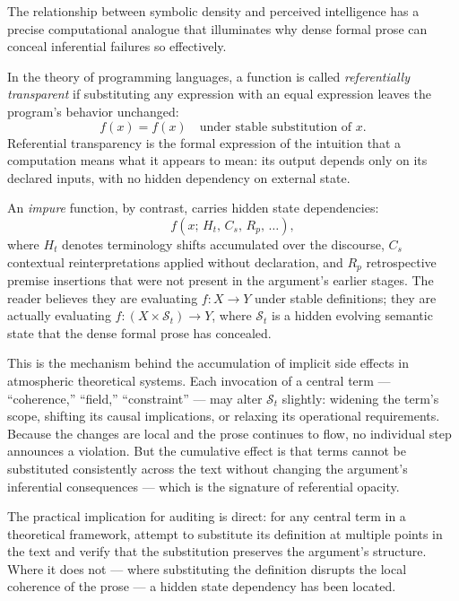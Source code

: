 \documentclass[12pt, openright, twoside]{book}
\begin{document}
\begin{technicalnote}[title={Technical Note: Semantic Referential Transparency}]

The relationship between symbolic density and perceived intelligence has a precise
computational analogue that illuminates why dense formal prose can conceal inferential
failures so effectively.

In the theory of programming languages, a function is called \emph{referentially
transparent} if substituting any expression with an equal expression leaves the
program's behavior unchanged:
\[
f(x) = f(x) \quad \text{under stable substitution of } x.
\]
Referential transparency is the formal expression of the intuition that a computation
means what it appears to mean: its output depends only on its declared inputs, with
no hidden dependency on external state.

An \emph{impure} function, by contrast, carries hidden state dependencies:
\[
f(x;\, H_t,\, C_s,\, R_p,\, \ldots),
\]
where $H_t$ denotes terminology shifts accumulated over the discourse, $C_s$
contextual reinterpretations applied without declaration, and $R_p$ retrospective
premise insertions that were not present in the argument's earlier stages. The reader
believes they are evaluating $f : X \to Y$ under stable definitions; they are
actually evaluating $f : (X \times \mathcal{S}_t) \to Y$, where $\mathcal{S}_t$ is
a hidden evolving semantic state that the dense formal prose has concealed.

This is the mechanism behind the accumulation of implicit side effects in atmospheric
theoretical systems. Each invocation of a central term --- ``coherence,'' ``field,''
``constraint'' --- may alter $\mathcal{S}_t$ slightly: widening the term's scope,
shifting its causal implications, or relaxing its operational requirements. Because
the changes are local and the prose continues to flow, no individual step announces
a violation. But the cumulative effect is that terms cannot be substituted consistently
across the text without changing the argument's inferential consequences --- which is
the signature of referential opacity.

The practical implication for auditing is direct: for any central term in a theoretical
framework, attempt to substitute its definition at multiple points in the text and
verify that the substitution preserves the argument's structure. Where it does not ---
where substituting the definition disrupts the local coherence of the prose ---
a hidden state dependency has been located.
\end{technicalnote}
\end{document}
